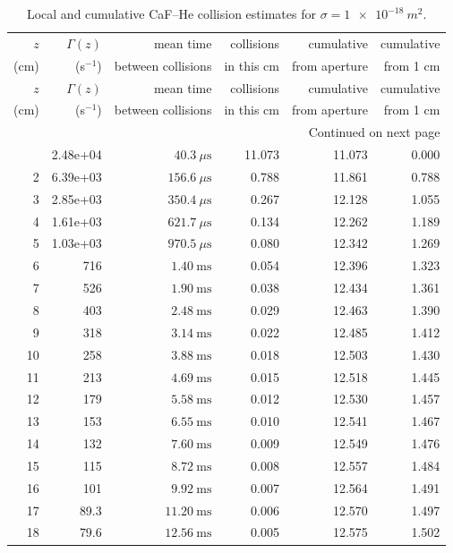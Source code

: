 \documentclass[11pt,a4paper]{article}
\begin{document}
\small
\begin{longtable}{@{}r r r r r r@{}}
\caption{Local and cumulative CaF--He collision estimates for $\sigma=\SI{1e-18}{m^2}$.}\label{tab:distance}\\
\toprule
$z$ & $\Gamma(z)$ & mean time & collisions & cumulative & cumulative \\
(cm) & (s$^{-1}$) & between collisions & in this cm & from aperture & from 1 cm \\
\midrule
\endfirsthead
\toprule
$z$ & $\Gamma(z)$ & mean time & collisions & cumulative & cumulative \\
(cm) & (s$^{-1}$) & between collisions & in this cm & from aperture & from 1 cm \\
\midrule
\endhead
\midrule
\multicolumn{6}{r}{Continued on next page}\\
\endfoot
\bottomrule
\endlastfoot
1 & 2.48e+04 & $40.3~\mu\mathrm{s}$ & 11.073 & 11.073 & 0.000 \\
2 & 6.39e+03 & $156.6~\mu\mathrm{s}$ & 0.788 & 11.861 & 0.788 \\
3 & 2.85e+03 & $350.4~\mu\mathrm{s}$ & 0.267 & 12.128 & 1.055 \\
4 & 1.61e+03 & $621.7~\mu\mathrm{s}$ & 0.134 & 12.262 & 1.189 \\
5 & 1.03e+03 & $970.5~\mu\mathrm{s}$ & 0.080 & 12.342 & 1.269 \\
6 & 716 & $1.40~\mathrm{ms}$ & 0.054 & 12.396 & 1.323 \\
7 & 526 & $1.90~\mathrm{ms}$ & 0.038 & 12.434 & 1.361 \\
8 & 403 & $2.48~\mathrm{ms}$ & 0.029 & 12.463 & 1.390 \\
9 & 318 & $3.14~\mathrm{ms}$ & 0.022 & 12.485 & 1.412 \\
10 & 258 & $3.88~\mathrm{ms}$ & 0.018 & 12.503 & 1.430 \\
11 & 213 & $4.69~\mathrm{ms}$ & 0.015 & 12.518 & 1.445 \\
12 & 179 & $5.58~\mathrm{ms}$ & 0.012 & 12.530 & 1.457 \\
13 & 153 & $6.55~\mathrm{ms}$ & 0.010 & 12.541 & 1.467 \\
14 & 132 & $7.60~\mathrm{ms}$ & 0.009 & 12.549 & 1.476 \\
15 & 115 & $8.72~\mathrm{ms}$ & 0.008 & 12.557 & 1.484 \\
16 & 101 & $9.92~\mathrm{ms}$ & 0.007 & 12.564 & 1.491 \\
17 & 89.3 & $11.20~\mathrm{ms}$ & 0.006 & 12.570 & 1.497 \\
18 & 79.6 & $12.56~\mathrm{ms}$ & 0.005 & 12.575 & 1.502 \\

\end{longtable}
\end{document}
